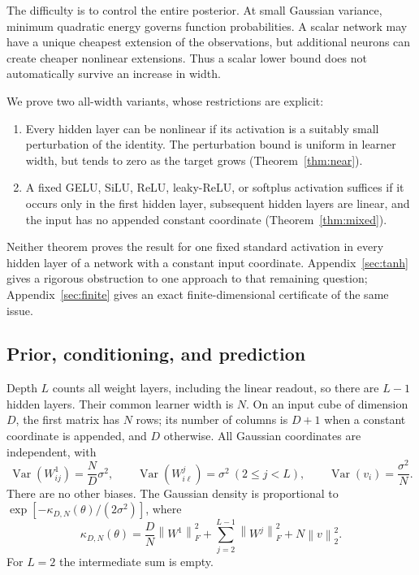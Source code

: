 \documentclass[11pt]{article}
\theoremstyle{remark}\newtheorem{remark}[theorem]{Remark}
\newcommand{\norm}[1]{\left\lVert #1\right\rVert}
\begin{document}
The difficulty is to control the entire posterior. At small Gaussian
variance, minimum quadratic energy governs function probabilities. A
scalar network may have a unique cheapest extension of the observations,
but additional neurons can create cheaper nonlinear extensions. Thus a
scalar lower bound does not automatically survive an increase in width.

We prove two all-width variants, whose restrictions are explicit:
\begin{enumerate}
\item Every hidden layer can be nonlinear if its activation is a suitably
small perturbation of the identity. The perturbation bound is uniform in
learner width, but tends to zero as the target grows
(Theorem~\ref{thm:near}).
\item A fixed GELU, SiLU, ReLU, leaky-ReLU, or softplus activation suffices
if it occurs only in the first hidden layer, subsequent hidden layers
are linear, and the input has no appended constant coordinate
(Theorem~\ref{thm:mixed}).
\end{enumerate}
Neither theorem proves the result for one fixed standard activation in
every hidden layer of a network with a constant input coordinate.
Appendix~\ref{sec:tanh} gives a rigorous obstruction to one approach to
that remaining question; Appendix~\ref{sec:finite} gives an exact
finite-dimensional certificate of the same issue.

\subsection{Prior, conditioning, and prediction}

Depth $L$ counts all weight layers, including the linear readout, so
there are $L-1$ hidden layers. Their common learner width is $N$.
On an input cube of dimension $D$, the first matrix has $N$ rows;
its number of columns is $D+1$ when a constant coordinate is appended,
and $D$ otherwise. All Gaussian coordinates are independent, with
\begin{equation}\label{eq:prior}
 \operatorname{Var}(W^1_{ij})=\frac ND\sigma^2,\qquad
 \operatorname{Var}(W^j_{i\ell})=\sigma^2\ (2\le j<L),\qquad
 \operatorname{Var}(v_i)=\frac{\sigma^2}{N}.
\end{equation}
There are no other biases. The Gaussian density is proportional to
$\exp[-\kappa_{D,N}(\theta)/(2\sigma^2)]$, where
\begin{equation}\label{eq:energy}
 \kappa_{D,N}(\theta)=\frac DN\norm{W^1}_F^2+
       \sum_{j=2}^{L-1}\norm{W^j}_F^2+N\norm v_2^2.
\end{equation}
For $L=2$ the intermediate sum is empty.
\end{document}
